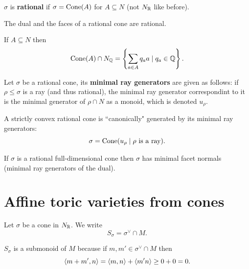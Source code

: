 \begin{definition}[]
$\sigma$ is \textbf{rational} if $\sigma=\mathrm{Cone}(A)$ for $A\subseteq N$ (not $N_{\mathbb{R}}$ like before).
\end{definition}



\begin{fact}
	The dual and the faces of a rational cone are rational.
\end{fact}

\begin{fact}
If $A\subseteq N$ then 
\[\mathrm{Cone}(A)\cap N_{\mathbb{Q}}=\left\{{\sum_{a\in A} q_a a\mid q_a\in \mathbb{Q}}\right\}.\]
\end{fact}

\begin{definition}[]
Let $\sigma$ be a rational cone, its \textbf{minimal ray generators} are given as follows: if $\rho\leq \sigma$ is a ray (and thus rational), the minimal ray generator correspondint to it is the minimal generator of $\rho\cap N$ as a monoid, which is denoted $u_\rho$.
\end{definition}

\begin{fact}
A strictly convex rational cone is ``canonically" generated by its minimal ray generators:
\[\sigma=\mathrm{Cone}(u_\rho\mid \rho\text{ is a ray}).\]
\end{fact}

\begin{corollary}
If $\sigma$ is a rational full-dimensional cone then $\sigma$ has minimal facet normals (minimal ray generators of the dual).
\end{corollary}




\section{Affine toric varieties from cones}

\begin{notation}
Let $\sigma$ be a cone in $N_{\mathbb{R}}$. We write
\[S_\sigma=\sigma^\vee\cap M.\]
\end{notation}
\begin{remark}
$S_\sigma$ is a submonoid of $M$ because if $m,m'\in \sigma^\vee\cap M$ then
\[\left\langle {m+m',n}\right\rangle=\left\langle {m,n}\right\rangle+\left\langle {m'n}\right\rangle\geq 0+0=0.\]
\end{remark}

